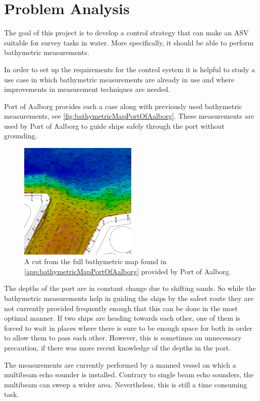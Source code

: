 \chapter{Problem Analysis}
%
The goal of this project is to develop a control strategy that can make an ASV suitable for survey tasks in water. More specifically, it should be able to perform bathymetric measurements.

In order to set up the requirements for the control system it is helpful to study a use case in which bathymetric measurements are already in use and where improvements in measurement techniques are needed.

Port of Aalborg provides such a case along with previously used bathymetric measurements, see \autoref{fig:bathymetricMapPortOfAalborg}. These measurements are used by Port of Aalborg to guide ships safely through the port without grounding.

\begin{figure}[H]
  \includegraphics[width=0.5\textwidth]{figures/smallDebthMapAalborg}
  \caption{A cut from the full bathymetric map found in \autoref{app:bathymetricMapPortOfAalborg} provided by Port of Aalborg.}
  \label{fig:bathymetricMapPortOfAalborg}
\end{figure}

The depths of the port are in constant change due to shifting sands. So while the bathymetric measurements help in guiding the ships by the safest route they are not currently provided frequently enough that this can be done in the most optimal manner. If two ships are heading towards each other, one of them is forced to wait in places where there is sure to be enough space for both in order to allow them to pass each other. However, this is sometimes an unnecessary precaution, if there was more recent knowledge of the depths in the port.

The measurements are currently performed by a manned vessel on which a multibeam echo sounder is installed. Contrary to single beam echo sounders, the multibeam can sweep a wider area. Nevertheless, this is still a time consuming task.

